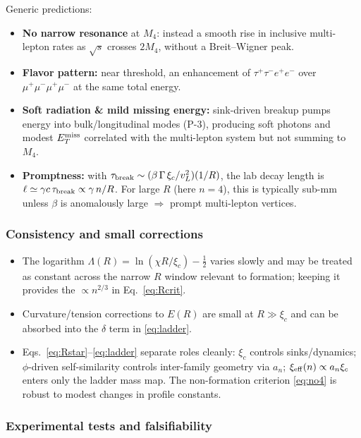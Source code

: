 Generic predictions:
\begin{itemize}
\item \textbf{No narrow resonance} at \(M_4\): instead a smooth rise in inclusive multi-lepton rates as \(\sqrt{s}\) crosses \(2M_4\), without a Breit–Wigner peak.
\item \textbf{Flavor pattern:} near threshold, an enhancement of \(\tau^+\tau^- e^+e^-\) over \(\mu^+\mu^-\mu^+\mu^-\) at the same total energy.
\item \textbf{Soft radiation \& mild missing energy:} sink-driven breakup pumps energy into bulk/longitudinal modes (P-3), producing soft photons and modest \(E_T^{\rm miss}\) correlated with the multi-lepton system but not summing to \(M_4\).
\item \textbf{Promptness:} with \(\tau_{\rm break}\sim(\beta\,\Gamma\,\xi_c/v_L^2)(1/R)\), the lab decay length is \(\ell\simeq \gamma c\,\tau_{\rm break}\propto \gamma\,n/R\). For large \(R\) (here \(n{=}4\)), this is typically sub-mm unless \(\beta\) is anomalously large \(\Rightarrow\) prompt multi-lepton vertices.
\end{itemize}

\subsubsection{Consistency and small corrections}
\begin{itemize}
\item The logarithm \(\Lambda(R)=\ln(\chi R/\xi_c)-\tfrac12\) varies slowly and may be treated as constant across the narrow \(R\) window relevant to formation; keeping it provides the \(\propto n^{2/3}\) in Eq.~\eqref{eq:Rcrit}.
\item Curvature/tension corrections to \(E(R)\) are small at \(R\!\gg\!\xi_c\) and can be absorbed into the \(\delta\) term in \eqref{eq:ladder}.
\item Eqs.~\eqref{eq:Rstar}--\eqref{eq:ladder} separate roles cleanly: \(\xi_c\) controls sinks/dynamics; \(\phi\)-driven self-similarity controls inter-family geometry via \(a_n\); \(\xi_{\rm eff}(n)\propto a_n\xi_c\) enters only the ladder mass map. The non-formation criterion \eqref{eq:no4} is robust to modest changes in profile constants.
\end{itemize}

\subsubsection{Experimental tests and falsifiability}

